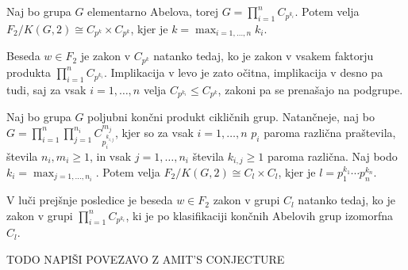 \begin{posledica}
\label{psl_lastnosti_zakonov_elementarno_abelove}
Naj bo grupa $G$ elementarno Abelova, torej $G = \prod_{i = 1}^{n} C_{p^{k_{i}}}$. Potem velja $F_2 / K(G, 2) \cong C_{p^{k}} \times C_{p^{k}}$, kjer je $k = \max_{i = 1 , \ldots , n} k_i$.
\end{posledica}
\begin{dokaz}
 Beseda $w \in F_2$ je zakon v $C_{p^{k}}$ natanko tedaj, ko je zakon v vsakem faktorju produkta $\prod_{i = 1}^{n} C_{p^{k_{i}}}$. Implikacija v levo je zato očitna, implikacija v desno pa tudi,
saj za vsak $i = 1 , \ldots , n$ velja $C_{p^{k_{i}}} \le C_{p^{k}}$, zakoni pa se prenašajo na podgrupe.
\end{dokaz}

\begin{posledica}
\label{psl_lastnosti_zakonov_splosni_produkti_ciklicnih}
Naj bo grupa $G$ poljubni končni produkt cikličnih grup. Natančneje, naj bo $G = \prod_{i = 1}^{n} \prod_{j = 1}^{n_i} C_{p_{i}^{k_{i,j}}}^{m_j}$, kjer so za vsak $i = 1, \ldots, n$ $p_i$ paroma različna praštevila, števila $n_i, m_{i} \ge 1$, in vsak $j = 1, \ldots , n_i$ števila $k_{i, j} \ge 1$ paroma različna. %
Naj bodo $k_i = \max_{j = 1, \ldots, n_i}$. Potem velja $F_2 / K(G, 2) \cong C_{l} \times C_{l}$, kjer je $l = p_1^{k_1} \cdots  p_n^{k_n}$.
\end{posledica}
\begin{dokaz}
V luči prejšnje posledice je beseda $w \in F_2$ zakon v grupi $C_l$ natanko tedaj, ko je zakon v grupi $\prod_{i = 1}^{n} C_{p^{k_i}}$, ki je po klasifikaciji končnih Abelovih grup izomorfna $C_l$.
\end{dokaz}


TODO %
NAPIŠI POVEZAVO Z AMIT'S CONJECTURE

